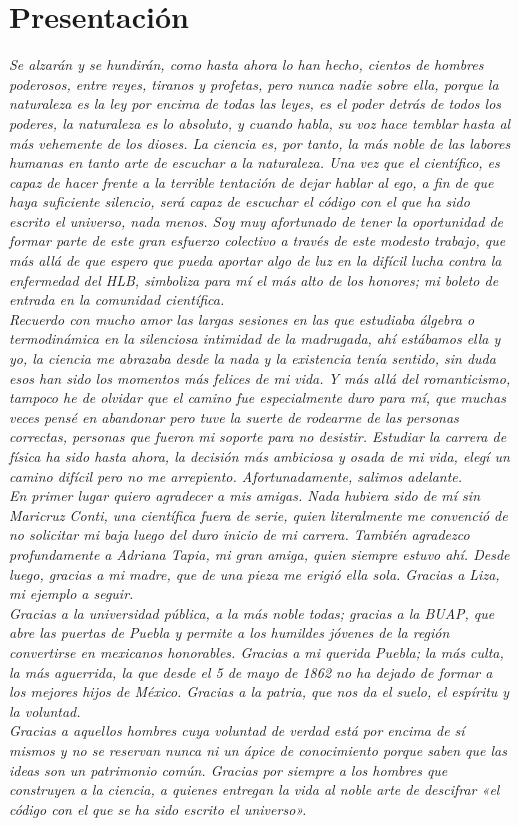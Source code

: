 \chapter{Presentación}

\textit{Se alzarán y se hundirán, como hasta ahora lo han hecho, cientos de hombres poderosos, entre reyes, tiranos y profetas, pero nunca nadie sobre ella, porque la naturaleza es la ley por encima de todas las leyes, es el poder detrás de todos los poderes, la naturaleza es lo absoluto, y cuando habla, su voz hace temblar hasta al más vehemente de los dioses. La ciencia es, por tanto, la más noble de las labores humanas en tanto arte de escuchar a la naturaleza. Una vez que el científico, es capaz de hacer frente a la terrible tentación de dejar hablar al ego, a fin de que haya suficiente silencio, será capaz de escuchar el código con el que ha sido escrito el universo, nada menos. Soy muy afortunado de tener la oportunidad de formar parte de este gran esfuerzo colectivo a través de este modesto trabajo, que más allá de que espero que pueda aportar algo de luz en la difícil lucha contra la enfermedad del HLB, simboliza para mí el más alto de los honores; mi boleto de entrada en la comunidad científica.\\
Recuerdo con mucho amor las largas sesiones en las que estudiaba álgebra o termodinámica en la silenciosa intimidad de la madrugada, ahí estábamos ella y yo, la ciencia me abrazaba desde la nada y la existencia tenía sentido, sin duda esos han sido los momentos más felices de mi vida. Y más allá del romanticismo, tampoco he de olvidar que el camino fue especialmente duro para mí, que muchas veces pensé en abandonar pero tuve la suerte de rodearme de las personas correctas, personas que fueron mi soporte para no desistir. Estudiar la carrera de física ha sido hasta ahora, la decisión más ambiciosa y osada de mi vida, elegí un camino difícil pero no me arrepiento. Afortunadamente, salimos adelante.\\
En primer lugar quiero agradecer a mis amigas. Nada hubiera sido de mí sin Maricruz Conti, una científica fuera de serie, quien literalmente me convenció de no solicitar mi baja luego del duro inicio de mi carrera. También agradezco profundamente a Adriana Tapia, mi gran amiga, quien siempre estuvo ahí. Desde luego, gracias a mi madre, que de una pieza me erigió ella sola. Gracias a Liza, mi ejemplo a seguir.\\
Gracias a la universidad pública, a la más noble todas; gracias a la BUAP, que abre las puertas de Puebla y permite a los humildes jóvenes de la región convertirse en mexicanos honorables. Gracias a mi querida Puebla; la más culta, la más aguerrida, la que desde el 5 de mayo de 1862 no ha dejado de formar a los mejores hijos de México. Gracias a la patria, que nos da el suelo, el espíritu y la voluntad.\\
Gracias a aquellos hombres cuya voluntad de verdad está por encima de sí mismos y no se reservan nunca ni un ápice de conocimiento porque saben que las ideas son un patrimonio común. Gracias por siempre a los hombres que construyen a la ciencia, a quienes entregan la vida al noble arte de descifrar «el código con el que se ha sido escrito el universo».
}




